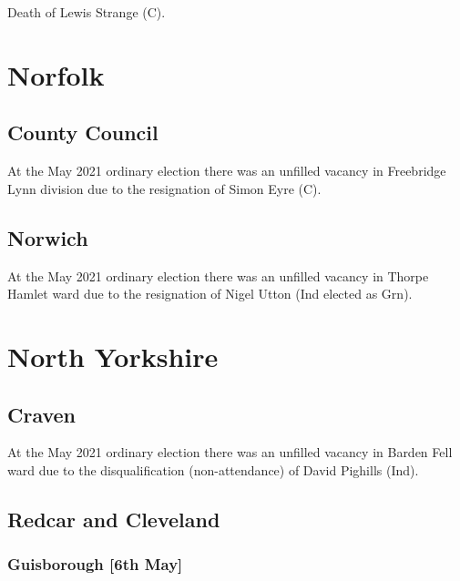 \documentclass[a4paper,openany]{book}
\begin{document}
\begin{resultsiii}

Death of Lewis Strange (C).

\section{Norfolk}

\subsection*{County Council}

At the May 2021 ordinary election there was an unfilled vacancy in Freebridge Lynn division due to the resignation of Simon Eyre (C).

\subsection*{Norwich}

At the May 2021 ordinary election there was an unfilled vacancy in Thorpe Hamlet ward due to the resignation of Nigel Utton (Ind elected as Grn).

\section{North Yorkshire}

\subsection*{Craven}

At the May 2021 ordinary election there was an unfilled vacancy in Barden Fell ward due to the disqualification (non-attendance) of David Pighills (Ind).

\subsection*{Redcar and Cleveland}

\subsubsection*{Guisborough \hspace*{\fill}\nolinebreak[1]%
	\enspace\hspace*{\fill}
	[6th May]}


\end{resultsiii}
\end{document}
